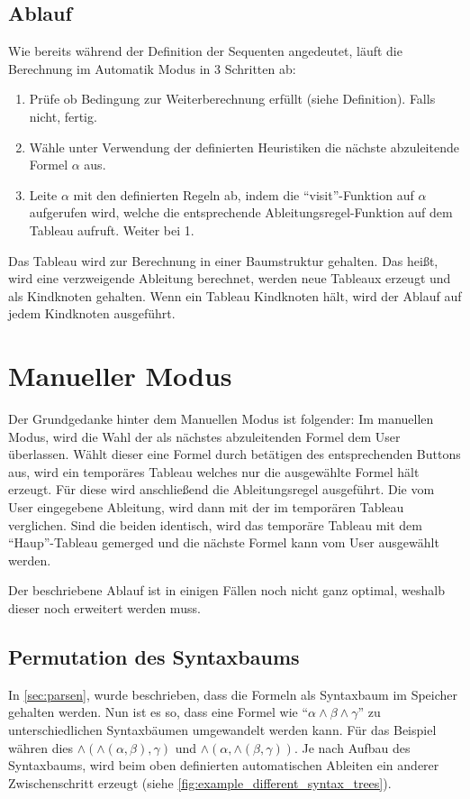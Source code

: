 \subsection{Ablauf}
Wie bereits während der Definition der Sequenten angedeutet, läuft die Berechnung im Automatik Modus in 3 Schritten ab:

\begin{enumerate}
\item Prüfe ob Bedingung zur Weiterberechnung erfüllt (siehe Definition). Falls nicht, fertig.

\item Wähle unter Verwendung der definierten Heuristiken die nächste abzuleitende Formel $\alpha$ aus.

\item Leite $\alpha$ mit den definierten Regeln ab, indem die ``visit''-Funktion auf $\alpha$ aufgerufen wird, welche die entsprechende Ableitungsregel-Funktion auf dem Tableau aufruft. Weiter bei 1.
\end{enumerate}

Das Tableau wird zur Berechnung in einer Baumstruktur gehalten. Das heißt, wird eine verzweigende Ableitung berechnet, werden neue Tableaux erzeugt und als Kindknoten gehalten. Wenn ein Tableau Kindknoten hält, wird der Ablauf auf jedem Kindknoten ausgeführt.

\section{Manueller Modus}
Der Grundgedanke hinter dem Manuellen Modus ist folgender: Im manuellen Modus, wird die Wahl der als nächstes abzuleitenden Formel dem User überlassen. Wählt dieser eine Formel durch betätigen des entsprechenden Buttons aus, wird ein temporäres Tableau welches nur die ausgewählte Formel hält erzeugt. Für diese wird anschließend die Ableitungsregel ausgeführt. Die vom User eingegebene Ableitung, wird dann mit der im temporären Tableau verglichen. Sind die beiden identisch, wird das temporäre Tableau mit dem ``Haup''-Tableau gemerged und die nächste Formel kann vom User ausgewählt werden.

Der beschriebene Ablauf ist in einigen Fällen noch nicht ganz optimal, weshalb dieser noch erweitert werden muss.

\subsection{Permutation des Syntaxbaums}
In \autoref{sec:parsen}, wurde beschrieben, dass die Formeln als Syntaxbaum im Speicher gehalten werden. Nun ist es so, dass eine Formel wie ``$\alpha\wedge\beta\wedge\gamma$'' zu unterschiedlichen Syntaxbäumen umgewandelt werden kann. Für das Beispiel währen dies $\wedge(\wedge(\alpha,\beta),\gamma)$ und $\wedge(\alpha,\wedge(\beta,\gamma))$. Je nach Aufbau des Syntaxbaums, wird beim oben definierten automatischen Ableiten ein anderer Zwischenschritt erzeugt (siehe \autoref{fig:example_different_syntax_trees}).

